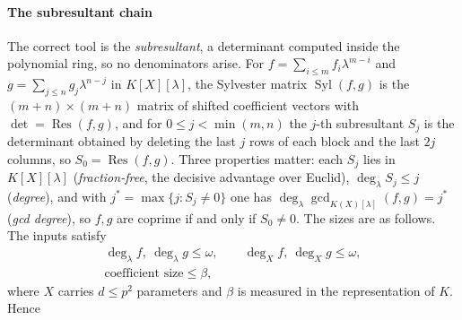 \documentclass[journal]{IEEEtran}
\theoremstyle{plainn}
\theoremstyle{remark}
\begin{document}
\paragraph{The subresultant chain}
The correct tool is the \emph{subresultant}, a determinant computed inside the polynomial ring, so no
denominators arise. For $f=\sum_{i\le m}f_i\lambda^{m-i}$ and $g=\sum_{j\le n}g_j\lambda^{n-j}$ in
$K[X][\lambda]$, the Sylvester matrix $\operatorname{Syl}(f,g)$ is the $(m+n)\times(m+n)$ matrix of
shifted coefficient vectors with $\det=\operatorname{Res}(f,g)$, and for $0\le j<\min(m,n)$ the $j$-th
subresultant $S_j$ is the determinant obtained by deleting the last $j$ rows of each block and the last
$2j$ columns, so $S_0=\operatorname{Res}(f,g)$. Three properties matter: each $S_j$ lies in
$K[X][\lambda]$ (\emph{fraction-free}, the decisive advantage over Euclid), $\deg_\lambda S_j\le j$
(\emph{degree}), and with $j^{*}=\max\{j:S_j\neq0\}$ one has
$\deg_\lambda\gcd_{K(X)[\lambda]}(f,g)=j^{*}$ (\emph{gcd degree}), so $f,g$ are coprime if and only if
$S_0\neq0$. The sizes are as follows. The inputs satisfy
\begin{equation}\label{appBC:eq:sizesin}
\begin{gathered}
\deg_\lambda f,\ \deg_\lambda g\le\omega,\qquad
\deg_X f,\ \deg_X g\le\omega,\\
\text{coefficient size}\le\beta ,
\end{gathered}
\end{equation}
where $X$ carries $d\le p^{2}$ parameters and $\beta$ is measured in the representation of $K$. Hence
\end{document}

